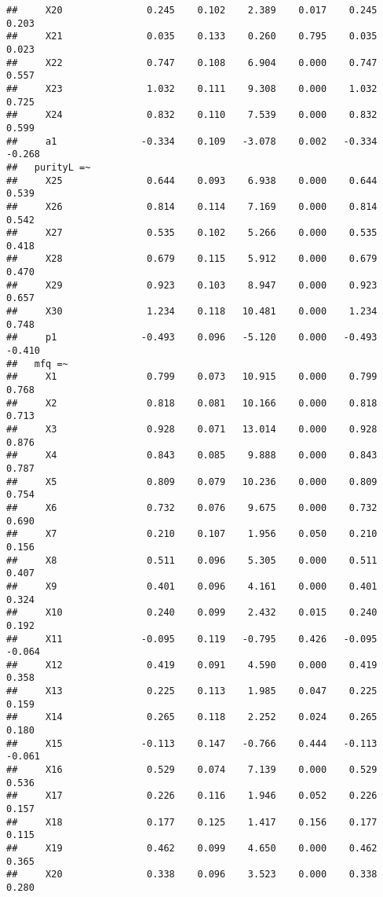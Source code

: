 \documentclass[english,man]{apa6}
\theoremstyle{definition}
\theoremstyle{definition}
\theoremstyle{definition}
\theoremstyle{remark}
\begin{document}
\begin{verbatim}
##     X20               0.245    0.102    2.389    0.017    0.245    0.203
##     X21               0.035    0.133    0.260    0.795    0.035    0.023
##     X22               0.747    0.108    6.904    0.000    0.747    0.557
##     X23               1.032    0.111    9.308    0.000    1.032    0.725
##     X24               0.832    0.110    7.539    0.000    0.832    0.599
##     a1               -0.334    0.109   -3.078    0.002   -0.334   -0.268
##   purityL =~                                                            
##     X25               0.644    0.093    6.938    0.000    0.644    0.539
##     X26               0.814    0.114    7.169    0.000    0.814    0.542
##     X27               0.535    0.102    5.266    0.000    0.535    0.418
##     X28               0.679    0.115    5.912    0.000    0.679    0.470
##     X29               0.923    0.103    8.947    0.000    0.923    0.657
##     X30               1.234    0.118   10.481    0.000    1.234    0.748
##     p1               -0.493    0.096   -5.120    0.000   -0.493   -0.410
##   mfq =~                                                                
##     X1                0.799    0.073   10.915    0.000    0.799    0.768
##     X2                0.818    0.081   10.166    0.000    0.818    0.713
##     X3                0.928    0.071   13.014    0.000    0.928    0.876
##     X4                0.843    0.085    9.888    0.000    0.843    0.787
##     X5                0.809    0.079   10.236    0.000    0.809    0.754
##     X6                0.732    0.076    9.675    0.000    0.732    0.690
##     X7                0.210    0.107    1.956    0.050    0.210    0.156
##     X8                0.511    0.096    5.305    0.000    0.511    0.407
##     X9                0.401    0.096    4.161    0.000    0.401    0.324
##     X10               0.240    0.099    2.432    0.015    0.240    0.192
##     X11              -0.095    0.119   -0.795    0.426   -0.095   -0.064
##     X12               0.419    0.091    4.590    0.000    0.419    0.358
##     X13               0.225    0.113    1.985    0.047    0.225    0.159
##     X14               0.265    0.118    2.252    0.024    0.265    0.180
##     X15              -0.113    0.147   -0.766    0.444   -0.113   -0.061
##     X16               0.529    0.074    7.139    0.000    0.529    0.536
##     X17               0.226    0.116    1.946    0.052    0.226    0.157
##     X18               0.177    0.125    1.417    0.156    0.177    0.115
##     X19               0.462    0.099    4.650    0.000    0.462    0.365
##     X20               0.338    0.096    3.523    0.000    0.338    0.280

\end{verbatim}
\end{document}
